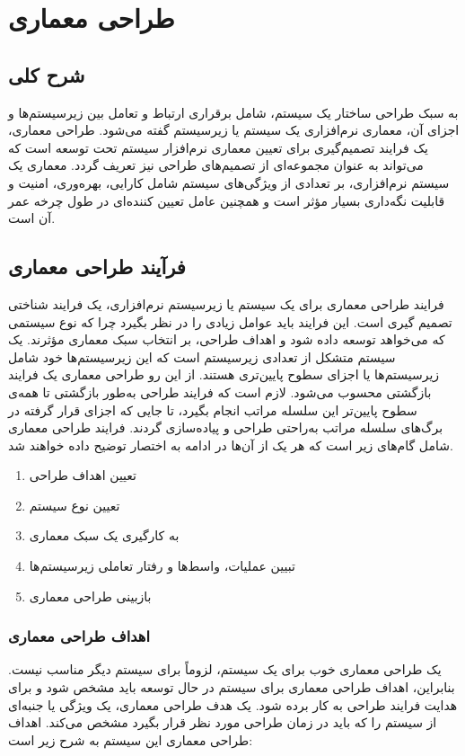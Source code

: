 \documentclass[12pt]{article}
\begin{document}
	\newpage
	\section{طراحی معماری}
	\subsection{شرح کلی}
	به سبک طراحی ساختار یک سیستم، شامل برقراری ارتباط و تعامل بین زیرسیستم‌ها و اجزای آن، معماری نرم‌افزاری یک سیستم یا زیرسیستم گفته می‌شود. طراحی معماری، یک فرایند تصمیم‌گیری برای تعیین معماری نرم‌افزار سیستم تحت توسعه است که می‌تواند به عنوان مجموعه‌ای از تصمیم‌های طراحی نیز تعریف گردد. معماری یک سیستم نرم‌افزاری، بر تعدادی از ویژگی‌های سیستم شامل کارایی، بهره‌وری، امنیت و قابلیت نگه‌داری بسیار مؤثر است و همچنین عامل تعیین کننده‌ای در طول چرخه عمر آن است.

	\subsection{فرآیند طراحی معماری}
	فرایند طراحی معماری برای یک سیستم یا زیرسیستم نرم‌افزاری، یک فرایند شناختی تصمیم گیری است. این فرایند باید عوامل زیادی را در نظر بگیرد چرا که نوع سیستمی که می‌خواهد توسعه داده شود و اهداف طراحی، بر انتخاب سبک معماری مؤثرند. یک سیستم متشکل از تعدادی زیرسیستم است که این زیرسیستم‌ها خود شامل زیرسیستم‌ها یا اجزای سطوح پایین‌تری هستند. از این رو طراحی معماری یک فرایند بازگشتی محسوب می‌شود. لازم است که فرایند طراحی به‌طور بازگشتی تا همه‌ی سطوح پایین‌تر این سلسله مراتب انجام بگیرد، تا جایی که اجزای قرار گرفته در برگ‌های سلسله مراتب به‌راحتی طراحی و پیاده‌سازی گردند. فرایند طراحی معماری شامل گام‌های زیر است که هر یک از آن‌ها در ادامه به اختصار توضیح داده خواهند شد.

	\begin{enumerate}
		\renewcommand{\labelenumi}{گام \arabic{enumi}.}
		\item
	تعیین اهداف طراحی
		\item
	تعیین نوع سیستم
		\item
	به کارگیری یک سبک معماری
		\item
	تبیین عملیات، واسط‌ها و رفتار تعاملی زیرسیستم‌ها
		\item
	بازبینی طراحی معماری
	\end{enumerate}

	\subsubsection{اهداف طراحی معماری}
	یک طراحی معماری خوب برای یک سیستم، لزوماً برای سیستم دیگر مناسب نیست. بنابراین، اهداف طراحی معماری برای سیستم در حال توسعه باید مشخص شود و برای هدایت فرایند طراحی به کار برده شود. یک هدف طراحی معماری، یک ویژگی یا جنبه‌ای از سیستم را که باید در زمان طراحی مورد نظر قرار بگیرد مشخص می‌کند. اهداف طراحی معماری این سیستم به شرح زیر است:
\end{document}
